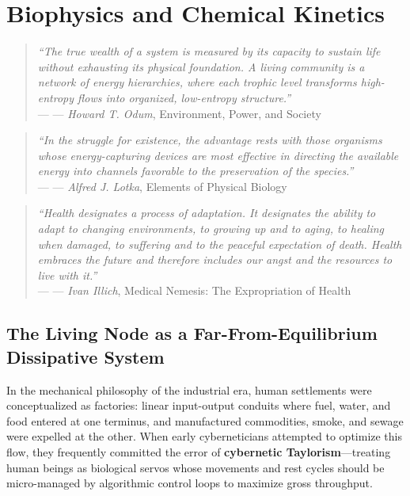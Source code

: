 \chapter{Biophysics and Chemical Kinetics}
\label{chap:biophysics}

\providecommand{\epigraph}[2]{%
  \begin{quote}
    \textit{#1} \\
    \raggedleft--- #2
  \end{quote}
}

\epigraph{
    ``The true wealth of a system is measured by its capacity to sustain life without exhausting its physical foundation. A living community is a network of energy hierarchies, where each trophic level transforms high-entropy flows into organized, low-entropy structure.''
}{--- \textit{Howard T. Odum}, \textnormal{Environment, Power, and Society} \cite{odum1971environment}}

\epigraph{
    ``In the struggle for existence, the advantage rests with those organisms whose energy-capturing devices are most effective in directing the available energy into channels favorable to the preservation of the species.''
}{--- \textit{Alfred J. Lotka}, \textnormal{Elements of Physical Biology} \cite{lotka1925elements}}

\epigraph{
    ``Health designates a process of adaptation. It designates the ability to adapt to changing environments, to growing up and to aging, to healing when damaged, to suffering and to the peaceful expectation of death. Health embraces the future and therefore includes our angst and the resources to live with it.''
}{--- \textit{Ivan Illich}, \textnormal{Medical Nemesis: The Expropriation of Health} \cite{illich1976medical}}

\section{The Living Node as a Far-From-Equilibrium Dissipative System}

In the mechanical philosophy of the industrial era, human settlements were conceptualized as factories: linear input-output conduits where fuel, water, and food entered at one terminus, and manufactured commodities, smoke, and sewage were expelled at the other. When early cyberneticians attempted to optimize this flow, they frequently committed the error of \textbf{cybernetic Taylorism}---treating human beings as biological servos whose movements and rest cycles should be micro-managed by algorithmic control loops to maximize gross throughput.

